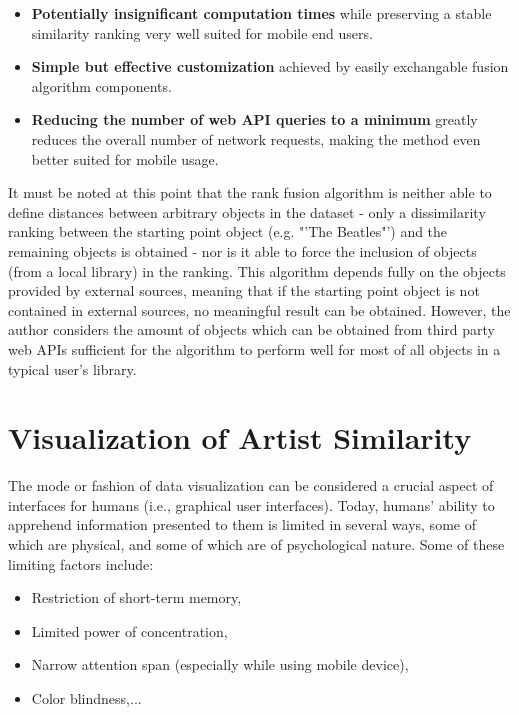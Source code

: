 \begin{itemize}
	\item \textbf{Potentially insignificant computation times} while preserving a stable similarity ranking very well suited for mobile end users.
	\item \textbf{Simple but effective customization} achieved by easily exchangable fusion algorithm components.
	\item \textbf{Reducing the number of web API queries to a minimum} greatly reduces the overall number of network requests, making the method even better suited for mobile usage.
\end{itemize}

It must be noted at this point that the rank fusion algorithm is neither able to define distances between arbitrary objects in the dataset - only a dissimilarity ranking between the starting point object (e.g. "'The Beatles"') and the remaining objects is obtained - nor is it able to force the inclusion of objects (from a local library) in the ranking. This algorithm depends fully on the objects provided by external sources, meaning that if the starting point object is not contained in external sources, no meaningful result can be obtained. However, the author considers the amount of objects which can be obtained from third party web APIs sufficient for the algorithm to perform well for most of all objects in a typical user's library.

\section{Visualization of Artist Similarity}

The mode or fashion of data visualization can be considered a crucial aspect of interfaces for humans (i.e., graphical user interfaces). Today, humans' ability to apprehend information presented to them is limited in several ways, some of which are physical, and some of which are of psychological nature. Some of these limiting factors include:

\begin{itemize}
	\item Restriction of short-term memory,
	\item Limited power of concentration,
	\item Narrow attention span (especially while using mobile device),
	\item Color blindness,...
\end{itemize}

